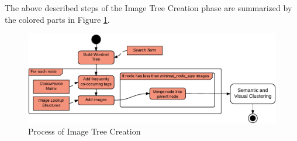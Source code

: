 \bigskip
The above described steps of the Image Tree Creation phase are summarized by the colored parts in Figure \ref{fig_imagetreecreation}.

\begin{figure}[h]
\centering
\includegraphics[width=\textwidth]{images/image_tree_creation.pdf}
\caption{Process of Image Tree Creation}
\label{fig_imagetreecreation}
\end{figure}
